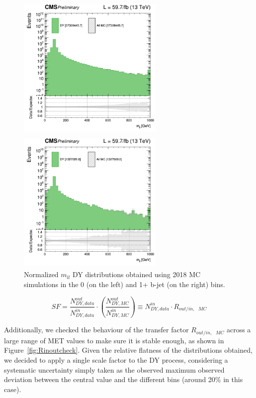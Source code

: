 \documentclass[a4paper, 10pt, openright]{report}
\begin{document}
\begin{figure}[htbp]
\begin{center}
\begin{minipage}[b]{.48\textwidth}
\includegraphics[width=7cm, height=7cm]{figs/log_cratio_0bjet_mll.png}
\end{minipage} \hfill
\begin{minipage}[b]{.48\textwidth}
\includegraphics[width=7cm, height=7cm]{figs/log_cratio_1bjetOrMore_mll.png}
\end{minipage} \hfill
\caption{Normalized $m_{ll}$ \ac{DY} distributions obtained using 2018 \ac{MC} simulations in the 0 (on the left) and 1+ b-jet (on the right) bins.}
\label{fig:Rinoutver}
\end{center}
\end{figure}

\begin{equation}
\label{eq:DYSF}
SF = \frac{N^{out}_{DY, data}}{N^{in}_{DY, data}} \cdot \left (\frac{N^{out}_{DY, MC}}{N^{in}_{DY, MC}} \right ) \equiv  N^{in}_{DY, data} \cdot R_{out/in,\text{ } MC}
\end{equation}

Additionally, we checked the behaviour of the transfer factor $R_{out/in,\text{ } MC}$ across a large range of \ac{MET} values to make sure it is stable enough, as shown in Figure~\ref{fig:Rinoutcheck}. Given the relative flatness of the distributions obtained, we decided to apply a single scale factor to the \ac{DY} process, considering a systematic uncertainty simply taken as the observed maximum observed deviation between the central value and the different bins (around 20\% in this case).
\end{document}
